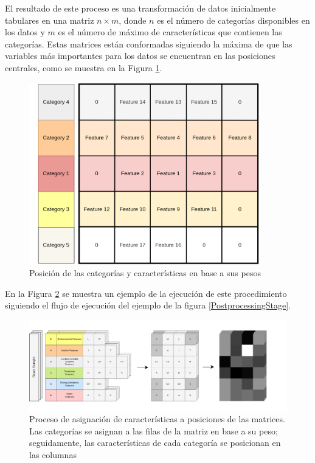 El resultado de este proceso es una transformación de datos inicialmente tabulares en una matriz $n \times m$, donde $n$ es el número de categorías disponibles en los datos y $m$ es el número de máximo de características que contienen las categorías. Estas matrices están conformadas siguiendo la máxima de que las variables más importantes para los datos se encuentran en las posiciones centrales, como se muestra en la Figura \ref{MatrixIndexes}.


\begin{figure}[H]
	\centering
	\includegraphics[width=10cm]{Figures/indexing_positions_2.png}
	\caption{Posición de las categorías y características en base a sus pesos}
	\label{MatrixIndexes}
\end{figure}

En la Figura \ref{MatrixConstruction} se muestra un ejemplo de la ejecución de este procedimiento siguiendo el flujo de ejecución del ejemplo de la figura \ref{PostprocessingStage}.

\begin{figure}[H]
	\centering
	\includegraphics[width=15cm]{Figures/Matrix Construction_2.png}
	\caption{Proceso de asignación de características a posiciones de las matrices. Las categorías se asignan a las filas de la matriz en base a su peso; seguidamente, las características de cada categoría se posicionan en las columnas}
	\label{MatrixConstruction}
\end{figure}

